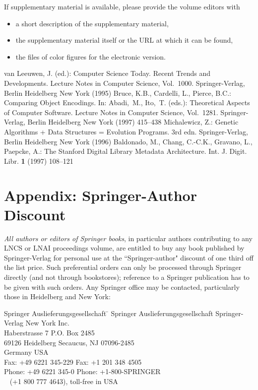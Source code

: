 \documentclass[a4paper]{llncs}
\begin{document}
\noindent
If supplementary material is available, please provide the volume
editors with
\begin{itemize}
\item a short description of the supplementary material,
\item the supplementary material itself or the URL at which it can be
found,
\item the files of color figures for the electronic version.
\end{itemize}


\begin{thebibliography}{4}
%
van Leeuwen, J. (ed.):
Computer Science Today. Recent Trends and Developments.
Lecture Notes in Computer Science, Vol.~1000.
Springer-Verlag, Berlin Heidelberg New York (1995)
%
Bruce, K.B., Cardelli, L., Pierce, B.C.:
Comparing Object Encodings.
In: Abadi,~M., Ito,~T. (eds.):
Theoretical Aspects of Computer Software.
Lecture Notes in Computer Science, Vol.~1281.
Springer-Verlag, Berlin Heidelberg New York (1997) 415--438
%
Michalewicz, Z.:
Genetic Algorithms + Data Structures = Evolution Programs.
3rd edn. Springer-Verlag, Berlin Heidelberg New York (1996)
%
Baldonado, M., Chang, C.-C.K., Gravano, L., Paepcke, A.:
The Stanford Digital Library Metadata Architecture.
Int. J. Digit. Libr. {\bf 1} (1997) 108--121
%
\end{thebibliography}


\section*{Appendix: Springer-Author Discount}

{\it All authors or editors of Springer books}, in particular authors
contributing to any LNCS or LNAI proceedings volume, are entitled to buy
any book published by Springer-Verlag for personal use at the
``Springer-author" discount of one third off the list price. Such
preferential orders can only be processed through Springer directly
(and not through bookstores); reference to a Springer publication has
to be given with such orders. Any Springer office may be contacted,
particularly those in Heidelberg and New York:

\begin{tabbing}
Springer Auslieferungsgesellschaft \hspace{1cm} \= \kill
Springer Auslieferungsgesellschaft \> Springer-Verlag New York Inc.\\
Haberstrasse 7 \> P.O. Box 2485\\
69126 Heidelberg \> Secaucus, NJ 07096-2485\\
Germany \> USA\\
Fax: +49 6221 345-229 \> Fax:   +1 201 348 4505\\
Phone: +49 6221 345-0 \> Phone: +1-800-SPRINGER\\
~ \> (+1 800 777 4643), toll-free in USA\\
\end{tabbing}
\end{document}
